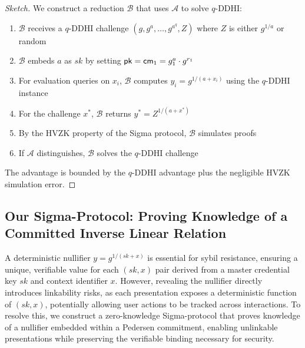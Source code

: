 \begin{proof}[Sketch]
We construct a reduction $\mathcal{B}$ that uses $\mathcal{A}$ to solve $q$-DDHI:
\begin{enumerate}
    \item $\mathcal{B}$ receives a $q$-DDHI challenge $(g, g^a, \ldots, g^{a^q}, Z)$ where $Z$ is either $g^{1/a}$ or random
    \item $\mathcal{B}$ embeds $a$ as $sk$ by setting $\mathsf{pk} = \mathsf{cm}_1 = g_1^a \cdot g^{r_1}$
    \item For evaluation queries on $x_i$, $\mathcal{B}$ computes $y_i = g^{1/(a+x_i)}$ using the $q$-DDHI instance
    \item For the challenge $x^*$, $\mathcal{B}$ returns $y^* = Z^{1/(a+x^*)}$
    \item By the HVZK property of the Sigma protocol, $\mathcal{B}$ simulates proofs
    \item If $\mathcal{A}$ distinguishes, $\mathcal{B}$ solves the $q$-DDHI challenge
\end{enumerate}
The advantage is bounded by the $q$-DDHI advantage plus the negligible HVZK simulation error.
\end{proof}























\subsection{Our Sigma-Protocol: Proving Knowledge of a Committed Inverse Linear Relation}\label{chap4:pok_committed_inverse_linear_relation}

A deterministic nullifier $y = g^{1/(sk + x)}$ is essential for sybil resistance, ensuring a unique, verifiable value for each $(sk, x)$ pair derived from a master credential key $sk$ and context identifier $x$. However, revealing the nullifier directly introduces linkability risks, as each presentation exposes a deterministic function of $(sk, x)$, potentially allowing user actions to be tracked across interactions. To resolve this, we construct a zero-knowledge Sigma-protocol that proves knowledge of a nullifier embedded within a Pedersen commitment, enabling unlinkable presentations while preserving the verifiable binding necessary for security.

